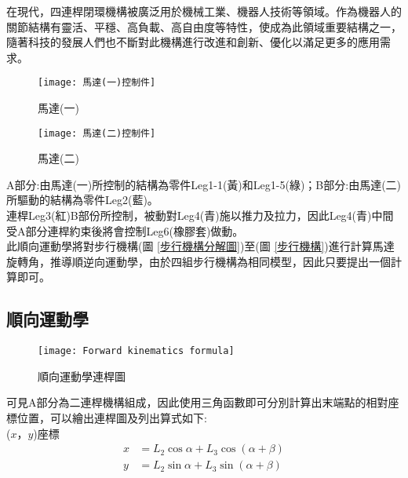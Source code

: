 在現代，四連桿閉環機構被廣泛用於機械工業、機器人技術等領域。作為機器人的關節結構有靈活、平穩、高負載、高自由度等特性，使成為此領域重要結構之一，隨著科技的發展人們也不斷對此機構進行改進和創新、優化以滿足更多的應用需求。\\

\begin{figure}[htbp]
  \begin{minipage}[t]{0.5\linewidth}
    \centering
    \texttt{[image: 馬達(一)控制件]}
    \caption{馬達(一)}
    \label{馬達(一)控制件}
  \end{minipage}
  \hfill
  \begin{minipage}[t]{0.4\linewidth}
    \centering
    \texttt{[image: 馬達(二)控制件]}
    \caption{馬達(二)}
    \label{馬達(二)控制件}
  \end{minipage}
\end{figure}

A部分:由馬達(一)所控制的結構為零件Leg1-1(黃)和Leg1-5(綠)；B部分:由馬達(二)所驅動的結構為零件Leg2(藍)。\\

連桿Leg3(紅)B部份所控制，被動對Leg4(青)施以推力及拉力，因此Leg4(青)中間受A部分連桿約束後將會控制Leg6(橡膠套)做動。\\

此順向運動學將對步行機構(圖 \ref{步行機構分解圖})至(圖 \ref{步行機構})進行計算馬達旋轉角，推導順逆向運動學，由於四組步行機構為相同模型，因此只要提出一個計算即可。
\newpage

\subsection{順向運動學}

\begin{figure}[hbt!]
\begin{center}
\texttt{[image: Forward kinematics formula]}
\caption{\Large 順向運動學連桿圖}\label{Forward kinematics formula}
\end{center}
\end{figure}

可見A部分為二連桿機構組成，因此使用三角函數即可分別計算出末端點的相對座標位置，可以繪出連桿圖及列出算式如下:\\

($x$，$y$)座標
\[
\begin{aligned}
x&=L_{2}\cos \alpha +L_{3}\cos \left( \alpha +\beta \right)\\
y&=L_{2}\sin \alpha +L_{3}\sin \left( \alpha +\beta \right)\\
\end{aligned}
\]\\

